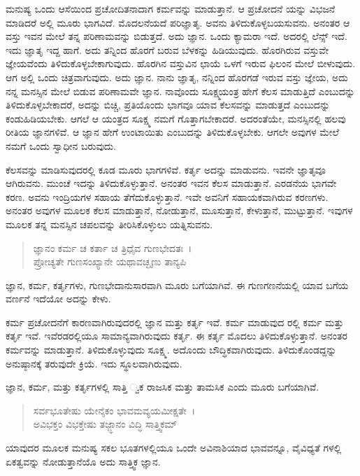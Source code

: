 ಮನುಷ್ಯ ಒಂದು ಆಸೆಯಿಂದ ಪ್ರಚೋದಿತನಾದಾಗ ಕರ್ಮವನ್ನು ಮಾಡುತ್ತಾನೆ. ಆ ಪ್ರಚೋದನೆ ಯನ್ನು ವಿಭಜನೆ ಮಾಡಿದರೆ ಅಲ್ಲಿ ಮೂರು ಭಾಗವಿದೆ. ಮೊದಲನೆಯದೆ ಪರಿಜ್ಞಾತೃ. ಅವನು ತಿಳಿದುಕೊಳ್ಳಬಯಸುವನು. ಅನಂತರ ಆ ವಸ್ತು ಇವನ ಮೇಲೆ ತನ್ನ ಪರಿಣಾಮವನ್ನು ಬಿಡುತ್ತದೆ. ಅದು ಜ್ಞಾನ. ಒಂದು ಕ್ಯಾಮರಾ ಇದೆ. ಅದರಲ್ಲಿ ಲೆನ್ಸ್ ಇದೆ. ಇದು ಜ್ಞಾತೃ ಇದ್ದ ಹಾಗೆ. ಅದು ತನ್ನಿಂದ ಹೊರಗೆ ಬರುವ ಬೆಳಕನ್ನು ಹಿಡಿಯುವುದು. ಹೊರಗಿರುವ ವಸ್ತುವೇ ಜ್ಞೇಯವೆಂದು ತಿಳಿದುಕೊಳ್ಳಬೇಕಾಗುವುದು. ಹೊರಗಿನ ವಸ್ತುವಿನ ಛಾಯೆ ಒಳಗೆ ಇರುವ ಫಿಲಂನ ಮೇಲೆ ಬೀಳುವುದು. ಆಗ ಅಲ್ಲಿ ಒಂದು ಚಿತ್ರವಾಗುವುದು. ಅದು ಜ್ಞಾನ. ನಾನು ಜ್ಞಾತೃ, ನನ್ನಿಂದ ಹೊರಗಡೆ ಇರುವ ವಸ್ತು ಜ್ಞೇಯ, ಅದು ನನ್ನ ಮನಸ್ಸಿನ ಮೇಲೆ ಬಿಡುವ ಪರಿಣಾಮವೇ ಜ್ಞಾನ. ನಾವೊಂದು ಸೂಕ್ಷ್ಮಯಂತ್ರ ಹೇಗೆ ಕೆಲಸ ಮಾಡುತ್ತಿದೆ ಎಂಬುದನ್ನು ತಿಳಿದುಕೊಳ್ಳಬೇಕಾದರೆ, ಅದನ್ನು ಬಿಚ್ಚಿ, ಪ್ರತಿಯೊಂದು ಭಾಗವೂ ಯಾವ ಕೆಲಸವನ್ನು ಮಾಡುತ್ತದೆ ಎಂಬುದನ್ನು ಕಂಡುಹಿಡಿಯಬೇಕು. ಆಗಲೆ ಆ ಯಂತ್ರದ ಸೂಕ್ಷ್ಮ ನಮಗೆ ಗೊತ್ತಾಗಬೇಕಾದರೆ. ಅದರಂತೆಯೇ, ಮನಸ್ಸಿನಲ್ಲಿ ಹಲವು ರೀತಿಯ ಜ್ಞಾನಗಳಿವೆ. ಆ ಜ್ಞಾನ ಹೇಗೆ ಉಂಟಾಯಿತು ಎಂಬುದನ್ನು ತಿಳಿದುಕೊಳ್ಳಬೇಕು. ಆಗಲೇ ಅವುಗಳ ಮೇಲೆ ನಮಗೆ ಒಂದು ಸ್ವಾಧೀನ ಬರುವುದು.

ಕೆಲಸವನ್ನು ಮಾಡಿಸುವುದರಲ್ಲಿ ಕೂಡ ಮೂರು ಭಾಗಗಳಿವೆ. ಕರ್ತೃ ಅದನ್ನು ಮಾಡುವನು. ಇವನೇ ಜ್ಞಾತೃವೂ ಆಗಿರುವನು. ಮುಂಚೆ ಇದನ್ನು ತಿಳಿದುಕೊಳ್ಳುತ್ತಾನೆ. ಅನಂತರ ಇವನ ಕೆಲಸ ಮಾಡುತ್ತಾನೆ. ಎರಡನೆಯ ಭಾಗವೇ ಕರಣ. ಅವನು ಇಂದ್ರಿಯಗಳ ಸಹಾಯ ತೆಗೆದುಕೊಳ್ಳುತ್ತಾನೆ. ಇವೇ ಅವನಿಗೆ ಸಹಾಯಕವಾಗಿರುವ ಕರಣಗಳು. ಅನಂತರ ಅವುಗಳ ಮೂಲಕ ಕೆಲಸ ಮಾಡುತ್ತಾನೆ, ನೋಡುತ್ತಾನೆ, ಮೂಸುತ್ತಾನೆ, ಕೇಳುತ್ತಾನೆ, ಮುಟ್ಟುತ್ತಾನೆ. ಇವುಗಳ ಮೂಲಕ ತನ್ನ ಮನಸ್ಸಿನ ಚಪಲವನ್ನು ತೀರಿಸಿಕೊಳ್ಳುಲು ಯತ್ನಿಸುವನು.

\begin{verse}
ಜ್ಞಾನಂ ಕರ್ಮ ಚ ಕರ್ತಾ ಚ ತ್ರಿಧೈವ ಗುಣಭೇದತಃ~।\\ಪ್ರೋಚ್ಯತೇ ಗುಣಸಂಖ್ಯಾನೇ ಯಥಾವಚ್ಛೃಣು ತಾನ್ಯಪಿ 
\end{verse}

{\small ಜ್ಞಾನ, ಕರ್ಮ, ಕರ್ತೃಗಳು, ಗುಣಭೇದಾನುಸಾರವಾಗಿ ಮೂರು ಬಗೆಯಾಗಿವೆ. ಈ ಗುಣಗಣನೆಯಲ್ಲಿ ಯಾವ ಬಗೆಯ ವರ್ಣನೆ ಇದೆಯೋ ಅದನ್ನು ಕೇಳು.}

ಕರ್ಮ ಪ್ರಚೋದನೆಗೆ ಕಾರಣವಾಗಿರುವುದರಲ್ಲಿ ಜ್ಞಾನ ಮತ್ತು ಕರ್ತೃ ಇವೆ. ಕರ್ಮ ಮಾಡುವುದ ರಲ್ಲಿ ಕರ್ಮ ಮತ್ತು ಕರ್ತೃ ಇವೆ. ಇವೆರಡರಲ್ಲಿಯೂ ಸಾಮಾನ್ಯವಾಗಿರುವುದು ಕರ್ತೃ. ಈ ಕರ್ತೃ ಮೊದಲು ತಿಳಿದುಕೊಳ್ಳುತ್ತಾನೆ. ಅನಂತರ ಕರ್ಮವನ್ನು ಮಾಡುತ್ತಾನೆ. ತಿಳಿದುಕೊಳ್ಳುವುದು ಸೂಕ್ಷ್ಮ. ಅದೊಂದು ಬೌದ್ಧಿಕವಾಗಿರುವುದು. ತಿಳಿದುಕೊಂಡದ್ದನ್ನು ಅನುಷ್ಠಾನಕ್ಕೆ ತರುವುದೇ ಕ್ರಿಯೆ. ಇದು ಸ್ಥೂಲವಾಗಿರುವುದು.

ಜ್ಞಾನ, ಕರ್ಮ, ಮತ್ತು ಕರ್ತೃಗಳಲ್ಲಿ ಸಾತ್ತಿ ್ವಕ ರಾಜಸಿಕ ಮತ್ತು ತಾಮಸಿಕ ಎಂದು ಮೂರು ಬಗೆಯಾಗಿವೆ.

\begin{verse}
ಸರ್ವಭೂತೇಷು ಯೇನೈಕಂ ಭಾವಮವ್ಯಯಮೀಕ್ಷತೇ~।\\ಅವಿಭಕ್ತಂ ವಿಭಕ್ತೇಷು ತಜ್ಜ್ಞಾನಂ ವಿದ್ಧಿ ಸಾತ್ತ್ವಿಕಮ್ 
\end{verse}

{\small ಯಾವುದರ ಮೂಲಕ ಮನುಷ್ಯ ಸಕಲ ಭೂತಗಳಲ್ಲಿಯೂ ಒಂದೇ ಅವಿನಾಶಿಯಾದ ಭಾವವನ್ನೂ, ವೈವಿಧ್ಯತೆ ಗಳಲ್ಲಿ ಏಕತ್ವವನ್ನು ನೋಡುತ್ತಾನೆಯೊ ಅದು ಸಾತ್ತ್ವಿಕ ಜ್ಞಾನ.}

